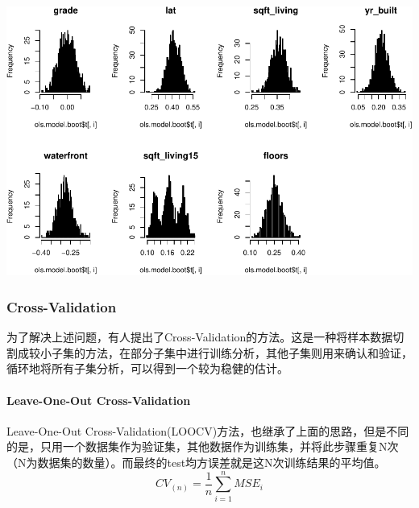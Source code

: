 \documentclass[]{article}
\newenvironment{Shaded}{\begin{snugshade}}{\end{snugshade}}
\newcommand{\KeywordTok}[1]{\textcolor[rgb]{0.13,0.29,0.53}{\textbf{#1}}}
\newcommand{\DataTypeTok}[1]{\textcolor[rgb]{0.13,0.29,0.53}{#1}}
\newcommand{\DecValTok}[1]{\textcolor[rgb]{0.00,0.00,0.81}{#1}}
\newcommand{\StringTok}[1]{\textcolor[rgb]{0.31,0.60,0.02}{#1}}
\newcommand{\OperatorTok}[1]{\textcolor[rgb]{0.81,0.36,0.00}{\textbf{#1}}}
\newcommand{\NormalTok}[1]{#1}
\let\oldparagraph\paragraph
\renewcommand{\paragraph}[1]{\oldparagraph{#1}\mbox{}}
\begin{document}
\includegraphics{FinalProjectForRegressionAnalysis_files/figure-latex/unnamed-chunk-39-1.pdf}

\subsubsection{Cross-Validation}\label{cross-validation}

为了解决上述问题，有人提出了Cross-Validation的方法。这是一种将样本数据切割成较小子集的方法，在部分子集中进行训练分析，其他子集则用来确认和验证，循环地将所有子集分析，可以得到一个较为稳健的估计。

\paragraph{Leave-One-Out
Cross-Validation}\label{leave-one-out-cross-validation}

Leave-One-Out
Cross-Validation(LOOCV)方法，也继承了上面的思路，但是不同的是，只用一个数据集作为验证集，其他数据作为训练集，并将此步骤重复N次（N为数据集的数量）。而最终的test均方误差就是这N次训练结果的平均值。
\[
CV_{(n)} = \frac{1}{n}\sum_{i = 1}^{n}MSE_i
\]

\begin{Shaded}
\end{Shaded}
\end{document}
